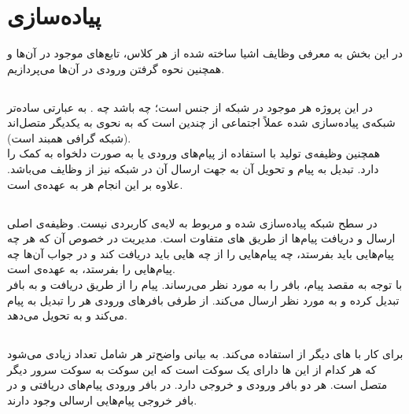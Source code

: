\documentclass{article}
\begin{document}
\section{پیاده‌سازی}
در این بخش به معرفی وظایف اشیا ساخته شده از هر کلاس، تابع‌های موجود در آن‌ها و همچنین نحوه گرفتن ورودی در آن‌ها می‌پردازیم.

\subsection{}
در این پروژه هر  موجود در شبکه از جنس  است؛ چه  باشد چه . به عبارتی ساده‌تر شبکه‌ی پیاده‌سازی شده عملاً اجتماعی از چندین  است که به نحوی به یکدیگر متصل‌اند (شبکه گرافی همبند است).  \\
 همچنین وظیفه‌ی تولید  با استفاده از پیام‌های ورودی  یا به صورت دلخواه به کمک  را دارد. تبدیل  به پیام و تحویل آن به  جهت ارسال آن در شبکه نیز از وظایف  می‌باشد. علاوه بر این انجام  هر  به عهده‌ی  است.




\subsection{}   
 در سطح شبکه پیاده‌سازی شده و مربوط به لایه‌ی کاربردی نیست. وظیفه‌ی اصلی  ارسال و دریافت پیام‌ها از طریق های متفاوت است. مدیریت در خصوص آن که هر  چه پیام‌هایی باید بفرستد، چه پیام‌هایی را از چه هایی باید دریافت کند و در جواب آن‌ها چه پیام‌هایی را بفرستد، به عهده‌ی  است. \\
 با توجه به مقصد پیام، بافر را به  مورد نظر می‌رساند.  پیام را از طریق  دریافت و به بافر تبدیل کرده و به  مورد نظر ارسال می‌کند. از طرفی بافر‌های ورودی هر  را تبدیل به پیام می‌کند و به  تحویل می‌دهد.




\subsection{}
 برای کار با های دیگر از  استفاده می‌کند. به بیانی واضح‌تر هر  شامل تعداد زیادی  می‌شود که هر کدام از این ها دارای یک سوکت است که این سوکت به سوکت سرور  دیگر متصل است. هر  دو بافر ورودی و خروجی دارد. در بافر ورودی پیام‌‌های دریافتی و در بافر خروجی پیام‌هایی ارسالی وجود دارند.
\end{document}
